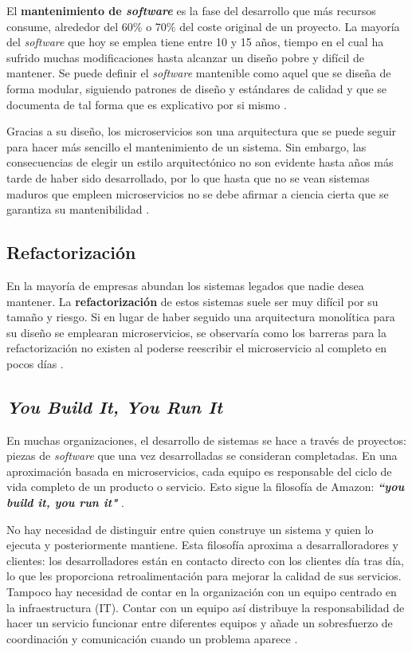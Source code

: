 \documentclass[11pt,spanish,listoffigures]{tfgetsinf}
\begin{document}
El \textbf{mantenimiento de \textit{software}} es la fase del desarrollo que más recursos consume, alrededor del 60\% o 70\% del coste original de un proyecto. La mayoría del \textit{software} que hoy se emplea tiene entre 10 y 15 años, tiempo en el cual ha sufrido muchas modificaciones hasta alcanzar un diseño pobre y difícil de mantener. Se puede definir el \textit{software} mantenible como aquel que se diseña de forma modular, siguiendo patrones de diseño y estándares de calidad y que se documenta de tal forma que es explicativo por si mismo \cite{Pressman}.

Gracias a su diseño, los microservicios son una arquitectura que se puede seguir para hacer más sencillo el mantenimiento de un sistema. Sin embargo, las consecuencias de elegir un estilo arquitectónico no son evidente hasta años más tarde de haber sido desarrollado, por lo que hasta que no se vean sistemas maduros que empleen microservicios no se debe afirmar a ciencia cierta que se garantiza su mantenibilidad \cite{Lewis2014}.

\subsection{Refactorización}


En la mayoría de empresas abundan los sistemas legados que nadie desea mantener. La \textbf{refactorización} de estos sistemas suele ser muy difícil por su tamaño y riesgo. Si en lugar de haber seguido una arquitectura monolítica para su diseño se emplearan microservicios, se observaría como los barreras para la refactorización no existen al poderse reescribir el microservicio al completo en pocos días \cite{Eaves2014}.

\subsection{\textit{You Build It, You Run It}}

En muchas organizaciones, el desarrollo de sistemas se hace a través de proyectos: piezas de \textit{software} que una vez desarrolladas se consideran completadas. En una aproximación basada en microservicios, cada equipo es responsable del ciclo de vida completo de un producto o servicio. Esto sigue la filosofía de Amazon: \textbf{\textit{``you build it, you run it"}} \cite{Lewis2014}.

No hay necesidad de distinguir entre quien construye un sistema y quien lo ejecuta y posteriormente mantiene. Esta filosofía aproxima a desarralloradores y clientes: los desarrolladores están en contacto directo con los clientes día tras día, lo que les proporciona retroalimentación para mejorar la calidad de sus servicios. Tampoco hay necesidad de contar en la organización con un equipo centrado en la infraestructura (IT). Contar con un equipo así distribuye la responsabilidad de hacer un servicio funcionar entre diferentes equipos y añade un sobresfuerzo de coordinación y comunicación cuando un problema aparece \cite{Vliet2011}.
\end{document}
